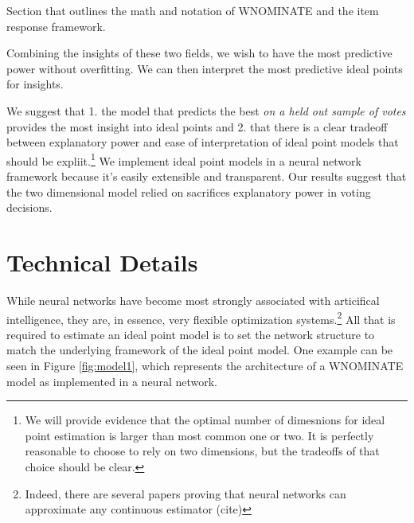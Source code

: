 \documentclass[11pt,]{article}
\begin{document}
Section that outlines the math and notation of WNOMINATE and the item
response framework.

Combining the insights of these two fields, we wish to have the most
predictive power without overfitting. We can then interpret the most
predictive ideal points for insights.

We suggest that 1. the model that predicts the best \emph{on a held out
sample of votes} provides the most insight into ideal points and 2. that
there is a clear tradeoff between explanatory power and ease of
interpretation of ideal point models that should be expliit.\footnote{We
  will provide evidence that the optimal number of dimesnions for ideal
  point estimation is larger than most common one or two. It is
  perfectly reasonable to choose to rely on two dimensions, but the
  tradeoffs of that choice should be clear.} We implement ideal point
models in a neural network framework because it's easily extensible and
transparent. Our results suggest that the two dimensional model relied
on sacrifices explanatory power in voting decisions.

\section{Technical Details}\label{technical-details}

While neural networks have become most strongly associated with
articifical intelligence, they are, in essence, very flexible
optimization systems.\footnote{Indeed, there are several papers proving
  that neural networks can approximate any continuous estimator (cite)}
All that is required to estimate an ideal point model is to set the
network structure to match the underlying framework of the ideal point
model. One example can be seen in Figure \ref{fig:model1}, which
represents the architecture of a WNOMINATE model as implemented in a
neural network.
\end{document}
